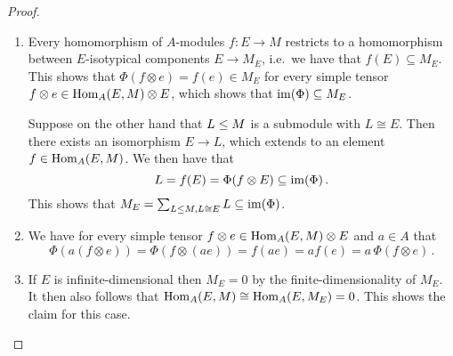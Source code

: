 \begin{proof}
  \leavevmode
  \begin{enumerate}
    \item
      Every homomorphism of $A$-modules $f \colon E \to M$ restricts to a homomorphism between $E$-isotypical components $ E \to M_E$, i.e.\ we have that $f(E) \subseteq M_E$.
      This shows that $\Phi(f \otimes e) = f(e) \in M_E$ for every simple tensor $f \otimes e \in \operatorname{Hom}_A(E,M) \otimes E$, which shows that $\operatorname{im}(\Phi) \subseteq M_E$.
      
      Suppose on the other hand that $L \leq M$ is a submodule with $L \cong E$.
      Then there exists an isomorphism $E \to L$, which extends to an element $f \in \operatorname{Hom}_A(E,M)$.
      We then have that
      \[
                  L
        =         f(E)
        =         \Phi(f \otimes E)
        \subseteq \operatorname{im}(\Phi) \,.
      \]
      This shows that $M_E = \sum_{L \leq M, L \cong E} L \subseteq \operatorname{im}(\Phi)$.
    \item
      We have for every simple tensor $f \otimes e \in \operatorname{Hom}_A(E,M) \otimes E$ and $a \in A$ that
      \[
          \Phi(a (f \otimes e))
        = \Phi(f \otimes (ae))
        = f(ae)
        = a f(e)
        = a \, \Phi(f \otimes e) \,.
      \]
    \item
      If $E$ is infinite-dimensional then $M_E = 0$ by the finite-dimensionality of $M_E$.
      It then also follows that $\operatorname{Hom}_A(E, M) \cong \operatorname{Hom}_A(E, M_E) = 0$.
      This shows the claim for this case.
      

\end{enumerate}
\end{proof}
